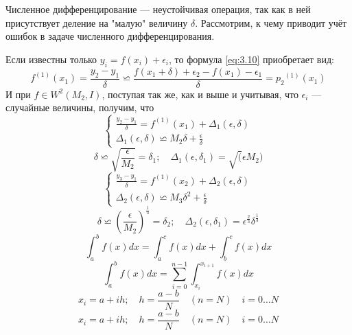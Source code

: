Численное дифференцирование --- неустойчивая операция, так как в ней присутствует деление на "малую" величину $\delta$. Рассмотрим, к чему приводит учёт ошибок в задаче численного дифференцирования.

Если известны только $y_i = f(x_i) + \epsilon_i$, то формула \ref{eq:3.10} приобретает вид:
\begin{dmath} \label{eq:3.10}
	f^{(1)}(x_1) = \frac{y_2 - y_1}{\delta} \backsimeq \frac{f(x_1 + \delta) + \epsilon_2 - f(x_1) - \epsilon_1}{\delta} = {p_2}^{(1)}(x_1)
\end{dmath}
И при $f \in W^2(M_2, I)$, поступая так же, как и выше и учитывая, что $\epsilon_i$ --- случайные величины, получим, что
\begin{dmath}
	\begin{cases}
		\frac{y_2 - y_1}{\delta} = f^{(1)}(x_1) + \Delta_1(\epsilon, \delta) \\
		\Delta_1(\epsilon, \delta) \backsimeq M_2\delta + \frac{\epsilon}{\delta}
	\end{cases}
\end{dmath}
\begin{equation}
	\delta \backsimeq \sqrt{\frac{\epsilon}{M_2}} = \delta_1; \quad \Delta_1(\epsilon, \delta_1) = \sqrt(\epsilon M_2)
\end{equation}
\begin{dmath}
	\begin{cases}
		\frac{y_3 - y_1}{\delta} = f^{(1)}(x_2) + \Delta_2(\epsilon, \delta) \\ 
		\Delta_2(\epsilon, \delta) \backsimeq M_3\delta^2 + \frac{\epsilon}{\delta}
	\end{cases}
\end{dmath}
\begin{equation}
	\delta \backsimeq {(\frac{\epsilon}{M_2})}^{\frac{1}{3}} = \delta_2; \quad \Delta_2(\epsilon, \delta_1) = \epsilon^{\frac{2}{3}} \delta^{\frac{1}{3}}
\end{equation}
\begin{equation}
	\int_{a}^{b} f(x)dx = \int_{a}^{c}f(x)dx + \int_{b}^{c}f(x)dx
\end{equation}
\begin{equation}
	\int_{a}^{b} f(x)dx = \sum_{i=0}^{n-1}\int_{x_i}^{x_{i+1}}f(x)dx
\end{equation}
\begin{equation}
	x_i = a + ih; \quad h = \frac{a-b}{N} \quad (n=N) \quad i=0 \dots N
\end{equation}
\begin{equation}
x_i = a + ih; \quad h = \frac{a-b}{N} \quad (n=N) \quad i=0 \dots N
\end{equation}
